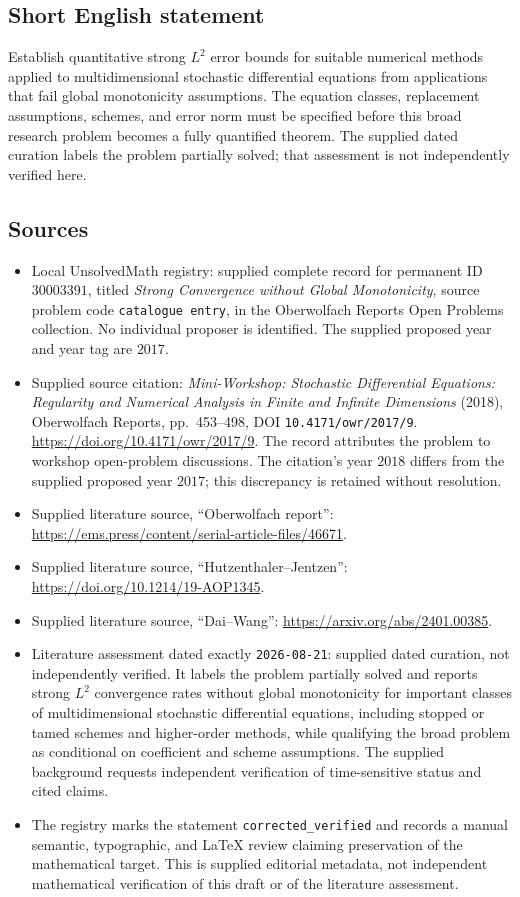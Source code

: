 \documentclass[11pt]{article}
\begin{document}
\subsection{Short English statement}
Establish quantitative strong \(L^2\) error bounds for suitable numerical methods applied to multidimensional stochastic differential equations from applications that fail global monotonicity assumptions. The equation classes, replacement assumptions, schemes, and error norm must be specified before this broad research problem becomes a fully quantified theorem. The supplied dated curation labels the problem partially solved; that assessment is not independently verified here.
\subsection{Sources}
\begin{itemize}
\item Local UnsolvedMath registry: supplied complete record for permanent ID \(30003391\), titled \emph{Strong Convergence without Global Monotonicity}, source problem code \texttt{catalogue entry}, in the Oberwolfach Reports Open Problems collection. No individual proposer is identified. The supplied proposed year and year tag are \(2017\).
\item Supplied source citation: \emph{Mini-Workshop: Stochastic Differential Equations: Regularity and Numerical Analysis in Finite and Infinite Dimensions} (2018), Oberwolfach Reports, pp.\ 453--498, DOI \texttt{10.4171/owr/2017/9}. \url{https://doi.org/10.4171/owr/2017/9}. The record attributes the problem to workshop open-problem discussions. The citation's year \(2018\) differs from the supplied proposed year \(2017\); this discrepancy is retained without resolution.
\item Supplied literature source, ``Oberwolfach report'': \url{https://ems.press/content/serial-article-files/46671}.
\item Supplied literature source, ``Hutzenthaler--Jentzen'': \url{https://doi.org/10.1214/19-AOP1345}.
\item Supplied literature source, ``Dai--Wang'': \url{https://arxiv.org/abs/2401.00385}.
\item Literature assessment dated exactly \texttt{2026-08-21}: supplied dated curation, not independently verified. It labels the problem partially solved and reports strong \(L^2\) convergence rates without global monotonicity for important classes of multidimensional stochastic differential equations, including stopped or tamed schemes and higher-order methods, while qualifying the broad problem as conditional on coefficient and scheme assumptions. The supplied background requests independent verification of time-sensitive status and cited claims.
\item The registry marks the statement \texttt{corrected\_verified} and records a manual semantic, typographic, and LaTeX review claiming preservation of the mathematical target. This is supplied editorial metadata, not independent mathematical verification of this draft or of the literature assessment.
\end{itemize}
\end{document}
